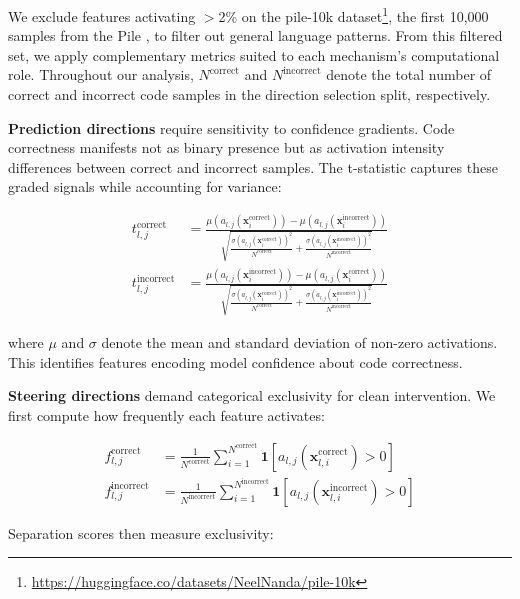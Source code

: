 We exclude features activating $>$2\% on the pile-10k dataset\footnote{\url{https://huggingface.co/datasets/NeelNanda/pile-10k}}, the first 10,000 samples from the Pile \cite{gao2020pile}, to filter out general language patterns. From this filtered set, we apply complementary metrics suited to each mechanism's computational role. Throughout our analysis, $N^{\text{correct}}$ and $N^{\text{incorrect}}$ denote the total number of correct and incorrect code samples in the direction selection split, respectively.

\textbf{Prediction directions} require sensitivity to confidence gradients. Code correctness manifests not as binary presence but as activation intensity differences between correct and incorrect samples. The t-statistic captures these graded signals while accounting for variance:

\begin{align}
t_{l,j}^{\text{correct}} &= \frac{\mu(a_{l,j}(\mathbf{x}_i^{\text{correct}})) - \mu(a_{l,j}(\mathbf{x}_i^{\text{incorrect}}))}{\sqrt{\frac{\sigma(a_{l,j}(\mathbf{x}_i^{\text{correct}}))^2}{N^{\text{correct}}} + \frac{\sigma(a_{l,j}(\mathbf{x}_i^{\text{incorrect}}))^2}{N^{\text{incorrect}}}}} \\
t_{l,j}^{\text{incorrect}} &= \frac{\mu(a_{l,j}(\mathbf{x}_i^{\text{incorrect}})) - \mu(a_{l,j}(\mathbf{x}_i^{\text{correct}}))}{\sqrt{\frac{\sigma(a_{l,j}(\mathbf{x}_i^{\text{correct}}))^2}{N^{\text{correct}}} + \frac{\sigma(a_{l,j}(\mathbf{x}_i^{\text{incorrect}}))^2}{N^{\text{incorrect}}}}}
\end{align}

where $\mu$ and $\sigma$ denote the mean and standard deviation of non-zero activations. This identifies features encoding model confidence about code correctness.

\textbf{Steering directions} demand categorical exclusivity for clean intervention. We first compute how frequently each feature activates:

\begin{align}
f_{l,j}^{\text{correct}} &= \frac{1}{N^\text{correct}} \sum_{i=1}^{N^\text{correct}} \mathbf{1}[a_{l,j}(\mathbf{x}_{l,i}^\text{correct}) > 0] \\
f_{l,j}^{\text{incorrect}} &= \frac{1}{N^\text{incorrect}} \sum_{i=1}^{N^\text{incorrect}} \mathbf{1}[a_{l,j}(\mathbf{x}_{l,i}^\text{incorrect}) > 0]
\end{align}

Separation scores then measure exclusivity:

